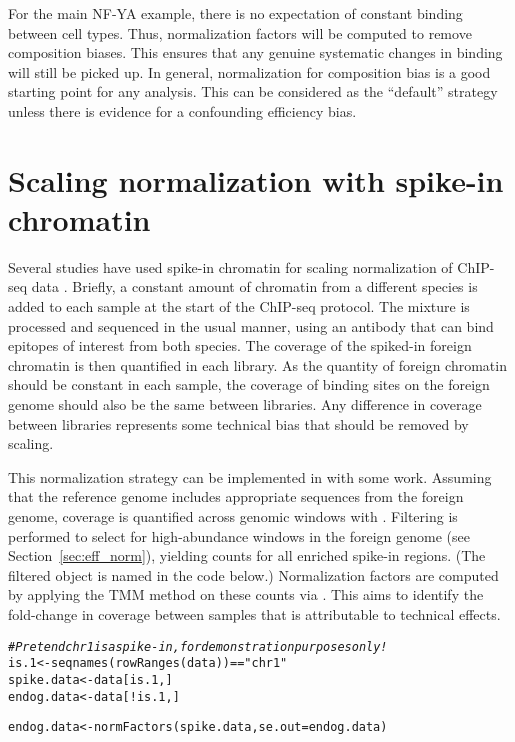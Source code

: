 \documentclass{report}\usepackage[]{graphicx}\usepackage[usenames,dvipsnames]{color}
\newcommand{\hlstr}[1]{\textcolor[rgb]{0.251,0.627,0.251}{#1}}%
\newcommand{\hlcom}[1]{\textcolor[rgb]{0.502,0.502,0.502}{\textit{#1}}}%
\newcommand{\hlopt}[1]{\textcolor[rgb]{0,0,0}{#1}}%
\newcommand{\hlstd}[1]{\textcolor[rgb]{0.251,0.251,0.251}{#1}}%
\newcommand{\hlkwb}[1]{\textcolor[rgb]{0,0,0}{#1}}%
\newcommand{\hlkwc}[1]{\textcolor[rgb]{0.251,0.251,0.251}{#1}}%
\newcommand{\hlkwd}[1]{\textcolor[rgb]{0.878,0.439,0.125}{#1}}%
\newenvironment{knitrout}{}{} %
\begin{document}
For the main NF-YA example, there is no expectation of constant binding between cell types.
Thus, normalization factors will be computed to remove composition biases.
This ensures that any genuine systematic changes in binding will still be picked up.
In general, normalization for composition bias is a good starting point for any analysis.
This can be considered as the ``default'' strategy unless there is evidence for a confounding efficiency bias.

\section{Scaling normalization with spike-in chromatin}
Several studies have used spike-in chromatin for scaling normalization of ChIP-seq data \cite{bonhoure2014quantifying,orlando2014quantitative}.
Briefly, a constant amount of chromatin from a different species is added to each sample at the start of the ChIP-seq protocol.
The mixture is processed and sequenced in the usual manner, using an antibody that can bind epitopes of interest from both species.
The coverage of the spiked-in foreign chromatin is then quantified in each library.
As the quantity of foreign chromatin should be constant in each sample, the coverage of binding sites on the foreign genome should also be the same between libraries.
Any difference in coverage between libraries represents some technical bias that should be removed by scaling.

This normalization strategy can be implemented in  with some work.
Assuming that the reference genome includes appropriate sequences from the foreign genome, coverage is quantified across genomic windows with .
Filtering is performed to select for high-abundance windows in the foreign genome (see Section~\ref{sec:eff_norm}), yielding counts for all enriched spike-in regions.
(The filtered object is named  in the code below.)
Normalization factors are computed by applying the TMM method on these counts via .
This aims to identify the fold-change in coverage between samples that is attributable to technical effects.

\begin{knitrout}
\color{fgcolor}\begin{kframe}
\begin{alltt}
\hlcom{# Pretend chr1 is a spike-in, for demonstration purposes only!}
\hlstd{is.1} \hlkwb{<-} \hlkwd{seqnames}\hlstd{(}\hlkwd{rowRanges}\hlstd{(data))}\hlopt{==}\hlstr{"chr1"}
\hlstd{spike.data} \hlkwb{<-} \hlstd{data[is.1,]}
\hlstd{endog.data} \hlkwb{<-} \hlstd{data[}\hlopt{!}\hlstd{is.1,]}

\hlstd{endog.data} \hlkwb{<-} \hlkwd{normFactors}\hlstd{(spike.data,} \hlkwc{se.out}\hlstd{=endog.data)}
\end{alltt}
\end{kframe}
\end{knitrout}
\end{document}
